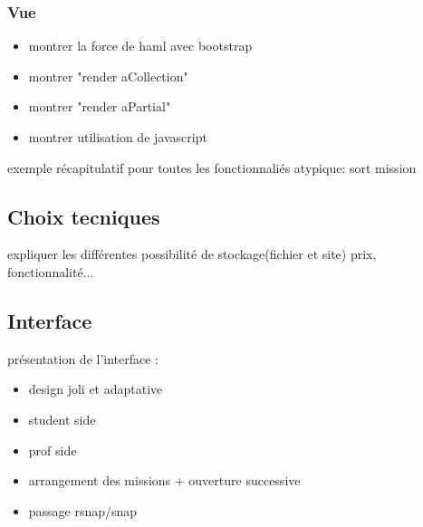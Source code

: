 \subsubsection{Vue}
\begin{itemize}
  \item montrer la force de haml avec bootstrap
  \item montrer "render aCollection"
  \item montrer "render aPartial"
  \item montrer utilisation de javascript
\end{itemize}

exemple récapitulatif pour toutes les fonctionnaliés atypique: sort mission

\subsection{Choix tecniques}
expliquer les différentes possibilité de stockage(fichier et site) prix, fonctionnalité...

\subsection{Interface}
présentation de l'interface :
\begin{itemize}
  \item design joli et adaptative
  \item student side
  \item prof side
  \item arrangement des missions + ouverture successive
  \item passage rsnap/snap
\end{itemize}
